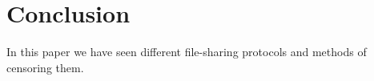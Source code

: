\section{Conclusion}\label{sec:conclusion}

In this paper we have seen different file-sharing protocols and methods of
censoring them.
